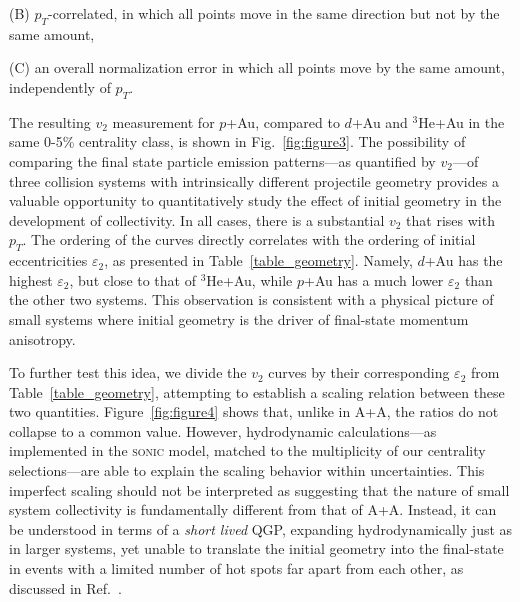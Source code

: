 \documentclass[%
reprint,
showpacs,preprintnumbers,
 amsmath,amssymb,
 aps,
]{revtex4-1}
\newcommand{\pt}{\mbox{$p_T$}\xspace}
\newcommand{\dau}{\mbox{$d$+Au}\xspace}
\newcommand{\pau}{\mbox{$p$+Au}\xspace}
\newcommand{\hau}{\mbox{$^3\text{He}$+Au}\xspace}
\begin{document}
(B) $p_{T}$-correlated, in which all points move in the same direction but
not by the same amount,

(C) an overall normalization error in which all points move by the
same amount, independently of $p_T$.

The resulting $v_2$ measurement for \pau, compared to \dau and \hau in the same 0-5\% centrality class, is shown in Fig.~\ref{fig:figure3}. The possibility of comparing the final state particle emission patterns---as quantified by $v_2$---of three collision systems with intrinsically different projectile geometry provides a valuable opportunity to quantitatively study the effect of initial geometry in the development of collectivity.  In all cases, there is a substantial $v_2$ that rises with \pt. The ordering of the curves directly correlates with the ordering of initial eccentricities $\varepsilon_2$, as presented in Table~\ref{table_geometry}. Namely, \dau has the highest $\varepsilon_2$, but close to that of \hau, while \pau has a much lower $\varepsilon_2$ than the other two systems. This observation is consistent with a physical picture of small systems where initial geometry is the driver of final-state momentum anisotropy.

To further test this idea, we divide the $v_2$ curves by their corresponding $\varepsilon_2$ from Table~\ref{table_geometry}, attempting to establish a scaling relation between these two quantities. Figure~\ref{fig:figure4} shows that, unlike in A+A, the ratios do not collapse to a common value. However, hydrodynamic calculations---as implemented in the \textsc{sonic} model, matched to the multiplicity of our centrality selections---are able to explain the scaling behavior within uncertainties. This imperfect scaling should not be interpreted as suggesting that the nature of small system collectivity is fundamentally different from that of A+A. Instead, it can be understood in terms of a \emph{short lived} QGP, expanding hydrodynamically just as in larger systems, yet unable to translate the initial geometry into the final-state in events with a limited number of hot spots far apart from each other, as discussed in Ref.~\cite{nagle_exploiting_2013}.
\end{document}
